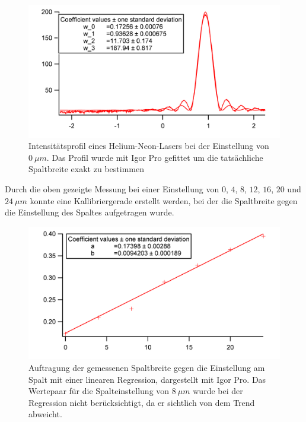 \begin{figure}[H]
	\centering	
	\begin{minipage}{1\textwidth}
		\includegraphics[width=\columnwidth]{180618/GraphSB0.png}
	\end{minipage}
	\caption{Intensitätsprofil eines Helium-Neon-Lasers bei der Einstellung von $0~\mu m$. Das Profil wurde mit Igor Pro gefittet um die tatsächliche Spaltbreite exakt zu bestimmen }
	\label{HeNe_0_Prof}
\end{figure}

Durch die oben gezeigte Messung bei einer Einstellung von $0$, $4$, $8$, $12$, $16$, $20$ und $24~\mu m$ konnte eine Kallibriergerade erstellt werden, bei der die Spaltbreite gegen die Einstellung des Spaltes aufgetragen wurde.

\begin{figure}[H]
	\centering	
	\begin{minipage}{1\textwidth}
		\includegraphics[width=\columnwidth]{180618/Graph_kal.png}
	\end{minipage}
	\caption{Auftragung der gemessenen Spaltbreite gegen die Einstellung am Spalt mit einer linearen Regression, dargestellt mit Igor Pro. Das Wertepaar für die Spalteinstellung von $8~\mu m$ wurde bei der Regression nicht berücksichtigt, da er sichtlich von dem Trend abweicht.}
	\label{HeNe_0_Prof}
\end{figure}

